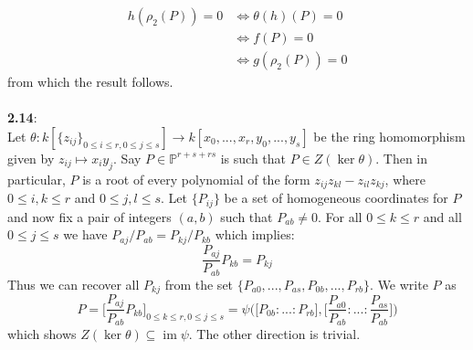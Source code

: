 \documentclass[12pt]{article}
\numberwithin{thm}{subsection}
\numberwithin{defn}{subsection}
\numberwithin{lemma}{subsection}
\numberwithin{example}{subsection}
\numberwithin{notation}{subsection}
\numberwithin{cor}{subsection}
\numberwithin{remark}{subsection}
\numberwithin{condition}{subsection}
\numberwithin{question}{subsection}
\numberwithin{construction}{subsection}
\numberwithin{construction}{subsection}
\numberwithin{construction}{subsection}
\newcommand{\bb}[1]{\mathbb{#1}}
\newcommand{\lto}{\longrightarrow}
\newcommand{\im}{\operatorname{im}}
\begin{document}
\begin{align*}
h(\rho_2(P)) = 0 &\Longleftrightarrow \theta(h)(P) = 0\\
& \Longleftrightarrow f(P) = 0\\
&\Longleftrightarrow g(\rho_2(P)) = 0
\end{align*}
from which the result follows.\\\\
%
\textbf{2.14}:\\
Let $\theta: k[\lbrace z_{ij}\rbrace_{0\leq i \leq r,0\leq j \leq s}] \lto k[x_0,...,x_r,y_0,...,y_s]$ be the ring homomorphism given by $z_{ij} \mapsto x_iy_j$. Say $P \in \bb{P}^{r + s + rs}$ is such that $P \in Z(\ker \theta)$. Then in particular, $P$ is a root of every polynomial of the form $z_{ij}z_{kl} - z_{il}z_{kj}$, where $0\leq i,k\leq r$ and $0\leq j,l\leq s$. Let $\lbrace P_{ij}\rbrace$ be a set of homogeneous coordinates for $P$ and now fix a pair of integers $(a,b)$ such that $P_{ab} \neq 0$. For all $0 \leq k\leq r$ and all $0 \leq j \leq s$ we have $P_{aj}/P_{ab} = P_{kj}/P_{kb}$ which implies:
\[\frac{P_{aj}}{P_{ab}}P_{kb} = P_{kj}\]
Thus we can recover all $P_{kj}$ from the set $\lbrace P_{a0},...,P_{as},P_{0b},...,P_{rb}\rbrace$. We write $P$ as
\[P = \Big[\frac{P_{aj}}{P_{ab}}P_{kb}\Big]_{0 \leq k \leq r, 0 \leq j \leq s} = \psi\Big(\big[P_{0b}:...:P_{rb}\big], \big[\frac{P_{a0}}{P_{ab}}:...:\frac{P_{as}}{P_{ab}}\big]\Big)\]
which shows $Z(\ker \theta) \subseteq \im \psi$. The other direction is trivial.\\\\
\end{document}
